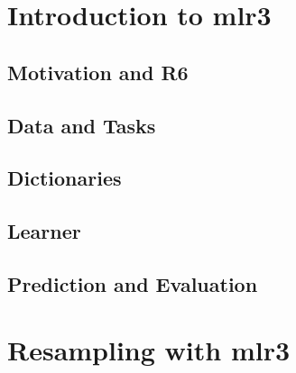 \documentclass[11pt,compress,t,n
otes=noshow, aspectratio=169, xcolor=table]{beamer}
\begin{document}
\newcommand{\learninggoals}{
\item Basics of mlr3: \\Train, Predict, Evaluate
\item Resampling in mlr3
\item Benchmarking in mlr3}




\section{Introduction to mlr3}
\subsection{Motivation and R6}


\subsection{Data and Tasks}


\subsection{Dictionaries}


\subsection{Learner}


\subsection{Prediction and Evaluation}


\section{Resampling with mlr3}

\end{document}
